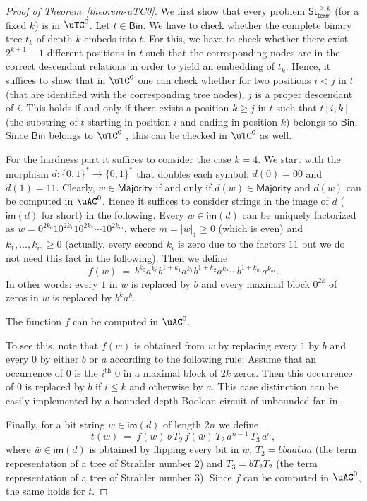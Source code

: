 \documentclass[a4paper,UKenglish,cleveref, autoref, thm-restate, numberwithinsect]{lipics-v2021}
\newcommand{\Bin}{\mathsf{Bin}}
\begin{document}
\begin{proof}[Proof of Theorem~\ref{theorem-uTC0}]
We first show that every problem $\mathsf{St}_{\mathsf{term}}^{\ge k}$ (for a fixed $k$) is in $\uTC^0$. 
Let $t \in \Bin$. We have to check whether the complete binary tree $t_k$ of depth $k$ embeds into $t$.
For this, we have to check whether there exist $2^{k+1}-1$ different positions in $t$ such that the corresponding
nodes are in the correct descendant relations in order to yield an embedding of $t_k$. Hence, it suffices
to show that in  $\uTC^0$ one can check whether for two positions $i < j$ in $t$ (that are identified with 
 the corresponding tree nodes), $j$ is a proper descendant of $i$. This holds if and only if there exists a position $k \geq j$ in $t$ such
that $t[i,k]$ (the substring of $t$ starting in position $i$ and ending in position $k$) belongs to $\Bin$. Since
$\Bin$ belongs to $\uTC^0$ \cite{Loh01rta}, this can be checked in $\uTC^0$ as well.

For the hardness part it suffices to consider the case $k=4$.
We start with the morphism $d :  \{0,1\}^* \to \{0,1\}^*$ that doubles each symbol: $d(0) = 00$ and $d(1) = 11$.
Clearly, $w \in \mathsf{Majority}$ if and only if $d(w) \in \mathsf{Majority}$ and $d(w)$ can be computed in $\uAC^0$.
Hence it suffices to consider strings in the image of $d$ ($\mathsf{im}(d)$ for short) in the following. Every $w \in \mathsf{im}(d)$ 
can be uniquely factorized as 
$w = 0^{2k_0} 1 0^{2k_1} 1  0^{2k_2} \cdots 1 0^{2k_m}$, where $m = |w|_1 \geq 0$ (which is even) 
and $k_1, \ldots, k_m \geq 0$ (actually, every second $k_i$ is zero due to the factors $11$ but we do not need this fact in the following).
Then we define
$$
f(w) \ = \ b^{k_0} a^{k_0} b^{1+k_1} a^{k_1} b^{1+k_2} a^{k_2} \cdots b^{1+k_m} a^{k_m}.
$$
In other words: every $1$ in $w$ is replaced by $b$ and every maximal block $0^{2 k}$ of zeros in $w$ is replaced by $b^k a^k$.
\begin{claim}
The function $f$ can be computed in $\uAC^0$.
\end{claim}

 \begin{claimproof}
To see this, note that  $f(w)$ is obtained from $w$ by replacing every 
 $1$ by $b$ and every $0$ by either $b$ or $a$ according to the following rule:
 Assume that an occurrence of $0$ is the $i^{\text{th}}$ $0$ in a maximal block of $2k$ zeros. Then this occurrence of $0$ is replaced by
 $b$ if $i \leq k$ and otherwise by $a$.
 This case distinction can be easily implemented by a bounded depth Boolean circuit of unbounded fan-in.
  \end{claimproof}
Finally, for a bit string $w \in \mathsf{im}(d)$ of length $2n$ we define
$$
t(w) \ = \ f(w) \, b  \, T_2  \, f(\bar{w})  \, T_2  \, a^{n-1}  \, T_3  \, a^n ,
$$
where $\bar{w} \in \mathsf{im}(d)$ is obtained by flipping every bit in $w$,
$T_2 = bbaabaa$ (the term representation of a tree of Strahler number 2) and $T_3 = bT_2 T_2$ (the term representation of a tree of Strahler number $3$).
Since $f$ can be computed in $\uAC^0$, the same holds for $t$.


\end{proof}
\end{document}
